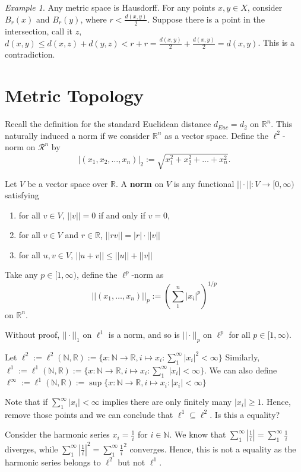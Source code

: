 \documentclass[article,11pt, reqno]{article}
\theoremstyle{remark}
\newtheorem*{example}{Example}
\newcommand{\mb}{\mathbb}
\newcommand{\mc}{\mathcal}
\newcommand{\<}{\langle}
\renewcommand{\>}{\rangle}
\begin{document}
\begin{example}
    Any metric space is Hausdorff. For any points $x, y\in X$, consider $B_r(x)$ and $B_r(y)$, where $r<\frac{d(x,y)}{2}$. Suppose there is a point in the intersection, call it $z$, $d(x,y)\leq d(x,z)+d(y,z)<r+r=\frac{d(x,y)}{2}+\frac{d(x,y)}{2}=d(x,y)$. This is a contradiction.
\end{example}


\section{Metric Topology}

Recall the definition for the standard Euclidean distance $d_{Euc}=d_2$ on $\mb R^n$. This naturally induced a norm if we consider $\mb R^n$ as a vector space. Define the $\ell^2$-norm on $\mc R^n$ by 
$$|(x_1, x_2, \dots, x_n)|_2 := \sqrt{x_1^2+x_2^2+\dots+x_n^2}.$$

Let $V$ be a vector space over $\mb R$. A \textbf{norm} on $V$ is any functional $||\cdot||:V\rightarrow[0,\infty)$ satisfying
\begin{enumerate}
    \item for all $v\in V$, $||v||=0$ if and only if $v=0$,
    \item for all $v\in V$ and $r\in \mb R$, $||rv||=|r|\cdot||v||$
    \item for all $u,v\in V$, $||u+v||\leq ||u||+||v||$
\end{enumerate}

Take any $p\in [1,\infty)$, define the $\ell^p$-norm as 
$$||(x_1, \dots, x_n)||_p:=(\sum_1^n|x_i|^p)^{1/p}$$
on $\mb R^n$.

Without proof, $||\cdot||_1$ on $\ell^1$ is a norm, and so is $||\cdot||_p$ on $\ell^p$ for all $p\in[1,\infty)$.

Let $\ell^2:=\ell^2(\mb N, \mb R):=\{x:\mb N\rightarrow\mb R, i\mapsto x_i: \sum_1^\infty|x_i|^2<\infty\}$
Similarly, $\ell^1:=\ell^1(\mb N, \mb R):=\{x:\mb N\rightarrow\mb R, i\mapsto x_i: \sum_1^\infty|x_i|<\infty\}$.
We can also define $\ell^\infty:=\ell^1(\mb N, \mb R):=\sup\{x:\mb N\rightarrow\mb R, i\mapsto x_i: |x_i|<\infty\}$

Note that if $\sum_1^\infty|x_i|<\infty$ implies there are only finitely many $|x_i|\geq 1$. Hence, remove those points and we can conclude that $\ell^1\subseteq \ell^2$. Is this a equality?

Consider the harmonic series $x_i=\frac{1}{i}$ for $i\in \mb N$.
We know that $\sum_1^\infty |\frac{1}{i}|=\sum_1^\infty \frac{1}{i}$ diverges, while $\sum_1^\infty |\frac{1}{i}|^2=\sum_1^\infty \frac{1}{i}^2$ converges. Hence, this is not a equality as the harmonic series belongs to $\ell^2$ but not $\ell^1$.
\end{document}
